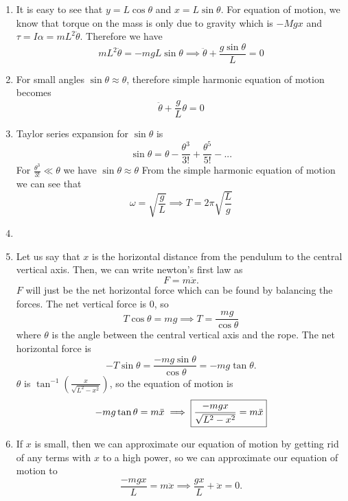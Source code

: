 \begin{sol}
\begin{enumerate}[label=\textbf{(\alph*)}]
    \item It is easy to see that $y = L \cos \theta$ and $x = L \sin \theta$. 
    For equation of motion, we know that torque on the mass is only due to gravity which is $-Mgx$ and $\tau = I \alpha = mL^2 \ddot {\theta}$. Therefore we have $$ mL^2 \ddot {\theta} = -mgL \sin \theta \implies \ddot {\theta} + \frac{g \sin \theta}{L} = 0$$
    \item For small angles $\sin \theta \approx \theta $, therefore simple harmonic equation of motion becomes $$ \ddot {\theta} + \frac{g}{L} \theta = 0 $$
    \item Taylor series expansion for $\sin \theta$ is $$ \sin \theta = \theta - \frac{\theta ^3}{3!}+\frac{\theta ^5}{5!}-... $$ For $\frac{\theta ^3}{3!} \ll \theta $ we have $\sin \theta \approx \theta $
    From the simple harmonic equation of motion we can see that $$\omega = \sqrt{\frac {g}{L}} \implies T = 2 \pi \sqrt {\frac{L}{g}}$$
    \item
    \item Let us say that $x$ is the horizontal distance from the pendulum to the central vertical axis. Then, we can write newton's first law as $$F = m\ddot{x}.$$ $F$ will just be the net horizontal force which can be found by balancing the forces. The net vertical force is 0, so $$T\cos\theta = mg \implies T = \frac{mg}{\cos\theta}$$ where $\theta$ is the angle between the central vertical axis and the rope. The net horizontal force is $$-T\sin\theta = \frac{-mg\sin\theta}{\cos\theta} = -mg\tan\theta.$$ $\theta$ is $\tan^{-1}(\frac{x}{\sqrt{L^2-x^2}})$, so the equation of motion is $$-mg\tan\theta = m\ddot{x} \implies \fbox{$\dfrac{-mgx}{\sqrt{L^2-x^2}} = m\ddot{x}$}$$
    \item If $x$ is small, then we can approximate our equation of motion by getting rid of any terms with $x$ to a high power, so we can approximate our equation of motion to $$\frac{-mgx}{L} = m\ddot{x} \implies \frac{gx}{L} + \ddot{x} = 0 .$$ 
\end{enumerate}
\end{sol}